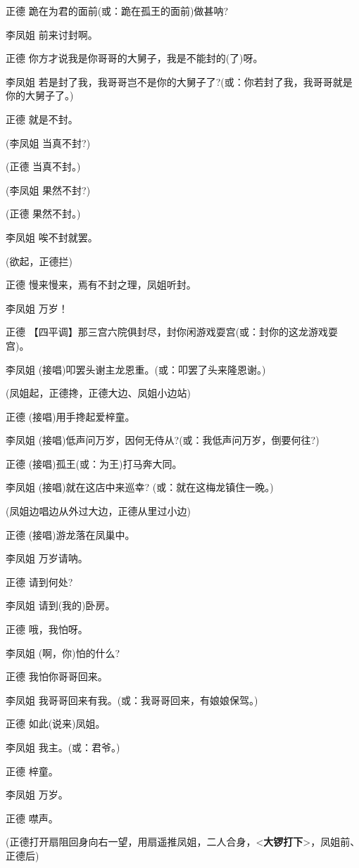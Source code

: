 正德 跪在为君的面前(或：跪在孤王的面前)做甚呐?

李凤姐 前来讨封啊。

正德 你方才说我是你哥哥的大舅子，我是不能封的(了)呀。

李凤姐
若是封了我，我哥哥岂不是你的大舅子了?(或：你若封了我，我哥哥就是你的大舅子了。)

正德 就是不封。

(李凤姐 当真不封?)

(正德 当真不封。)

(李凤姐 果然不封?)

(正德 果然不封。)

李凤姐 唉不封就罢。

(欲起，正德拦)

正德 慢来慢来，焉有不封之理，凤姐听封。

李凤姐 万岁！

正德
【四平调】那三宫六院俱封尽，封你闲游戏耍宫(或：封你的这龙游戏耍宫)。

李凤姐 (接唱)叩罢头谢主龙恩重。(或：叩罢了头来隆恩谢。)

(凤姐起，正德搀，正德大边、凤姐小边站)

正德 (接唱)用手搀起爱梓童。

李凤姐 (接唱)低声问万岁，因何无侍从?(或：我低声问万岁，倒要何往?)

正德 (接唱)孤王(或：为王)打马奔大同。

李凤姐 (接唱)就在这店中来巡幸? (或：就在这梅龙镇住一晚。)

(凤姐边唱边从外过大边，正德从里过小边)

正德 (接唱)游龙落在凤巢中。

李凤姐 万岁请呐。

正德 请到何处?

李凤姐 请到(我的)卧房。

正德 哦，我怕呀。

李凤姐 (啊，你)怕的什么?

正德 我怕你哥哥回来。

李凤姐 我哥哥回来有我。(或：我哥哥回来，有娘娘保驾。)

正德 如此(说来)凤姐。

李凤姐 我主。(或：君爷。)

正德 梓童。

李凤姐 万岁。

正德 噤声。

(正德打开扇阻回身向右一望，用扇遥推凤姐，二人合身，\textless{}\textbf{大锣打下}\textgreater{}，凤姐前、正德后)

